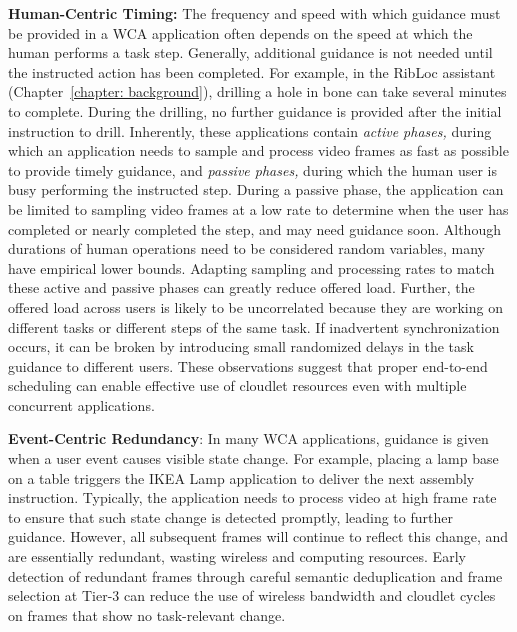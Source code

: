 \textbf{Human-Centric Timing:} The frequency and speed with which guidance must
be provided in a WCA application often depends on the speed at which the human
performs a task step.  Generally, additional guidance is not needed until the
instructed action has been completed. For example, in the RibLoc assistant
(Chapter~\ref{chapter: background}), drilling a hole in bone can take several
minutes to complete.  During the drilling, no further guidance is provided after
the initial instruction to drill.  Inherently, these applications contain {\em
active phases,} during which an application needs to sample and process video
frames as fast as possible to provide timely guidance, and {\em passive phases,}
during which the human user is busy performing the instructed step.  During a
passive phase, the application can be limited to sampling video frames at a low
rate to determine when the user has completed or nearly completed the step, and
may need guidance soon.  Although durations of human operations need to be
considered random variables, many have empirical lower bounds.  Adapting
sampling and processing rates to match these active and passive phases can
greatly reduce offered load.  Further, the offered load across users is likely
to be uncorrelated because they are working on different tasks or different
steps of the same task. If inadvertent synchronization occurs, it can be broken
by introducing small randomized delays in the task guidance to different users.
These observations suggest that proper end-to-end scheduling can enable
effective use of cloudlet resources even with multiple concurrent applications.

\textbf{Event-Centric Redundancy}: In many WCA applications, guidance
is given when a user event causes visible state change. For example,
placing a lamp base on a table triggers the IKEA Lamp application to
deliver the next assembly instruction.  Typically, the application
needs to process video at high frame rate to ensure that such state
change is detected promptly, leading to further guidance.  However,
all subsequent frames will continue to reflect this change, and are
essentially redundant, wasting wireless and computing resources.
Early detection of redundant frames through careful semantic
deduplication and frame selection at Tier-3 can reduce the use of
wireless bandwidth and cloudlet cycles on frames that show no
task-relevant change.

